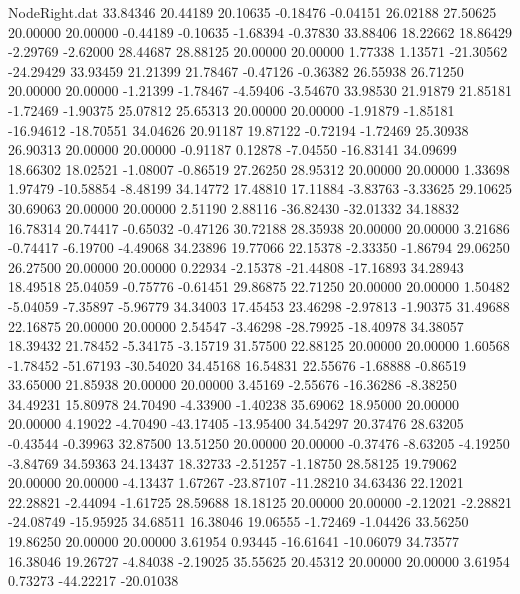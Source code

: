 \begin{filecontents}{NodeRight.dat}
  33.84346   20.44189   20.10635    -0.18476   -0.04151   26.02188   27.50625   20.00000   20.00000   -0.44189   -0.10635   -1.68394   -0.37830
  33.88406   18.22662   18.86429    -2.29769   -2.62000   28.44687   28.88125   20.00000   20.00000    1.77338    1.13571  -21.30562  -24.29429
  33.93459   21.21399   21.78467    -0.47126   -0.36382   26.55938   26.71250   20.00000   20.00000   -1.21399   -1.78467   -4.59406   -3.54670
  33.98530   21.91879   21.85181    -1.72469   -1.90375   25.07812   25.65313   20.00000   20.00000   -1.91879   -1.85181  -16.94612  -18.70551
  34.04626   20.91187   19.87122    -0.72194   -1.72469   25.30938   26.90313   20.00000   20.00000   -0.91187    0.12878   -7.04550  -16.83141
  34.09699   18.66302   18.02521    -1.08007   -0.86519   27.26250   28.95312   20.00000   20.00000    1.33698    1.97479  -10.58854   -8.48199
  34.14772   17.48810   17.11884    -3.83763   -3.33625   29.10625   30.69063   20.00000   20.00000    2.51190    2.88116  -36.82430  -32.01332
  34.18832   16.78314   20.74417    -0.65032   -0.47126   30.72188   28.35938   20.00000   20.00000    3.21686   -0.74417   -6.19700   -4.49068
  34.23896   19.77066   22.15378    -2.33350   -1.86794   29.06250   26.27500   20.00000   20.00000    0.22934   -2.15378  -21.44808  -17.16893
  34.28943   18.49518   25.04059    -0.75776   -0.61451   29.86875   22.71250   20.00000   20.00000    1.50482   -5.04059   -7.35897   -5.96779
  34.34003   17.45453   23.46298    -2.97813   -1.90375   31.49688   22.16875   20.00000   20.00000    2.54547   -3.46298  -28.79925  -18.40978
  34.38057   18.39432   21.78452    -5.34175   -3.15719   31.57500   22.88125   20.00000   20.00000    1.60568   -1.78452  -51.67193  -30.54020
  34.45168   16.54831   22.55676    -1.68888   -0.86519   33.65000   21.85938   20.00000   20.00000    3.45169   -2.55676  -16.36286   -8.38250
  34.49231   15.80978   24.70490    -4.33900   -1.40238   35.69062   18.95000   20.00000   20.00000    4.19022   -4.70490  -43.17405  -13.95400
  34.54297   20.37476   28.63205    -0.43544   -0.39963   32.87500   13.51250   20.00000   20.00000   -0.37476   -8.63205   -4.19250   -3.84769
  34.59363   24.13437   18.32733    -2.51257   -1.18750   28.58125   19.79062   20.00000   20.00000   -4.13437    1.67267  -23.87107  -11.28210
  34.63436   22.12021   22.28821    -2.44094   -1.61725   28.59688   18.18125   20.00000   20.00000   -2.12021   -2.28821  -24.08749  -15.95925
  34.68511   16.38046   19.06555    -1.72469   -1.04426   33.56250   19.86250   20.00000   20.00000    3.61954    0.93445  -16.61641  -10.06079
  34.73577   16.38046   19.26727    -4.84038   -2.19025   35.55625   20.45312   20.00000   20.00000    3.61954    0.73273  -44.22217  -20.01038

\end{filecontents}
